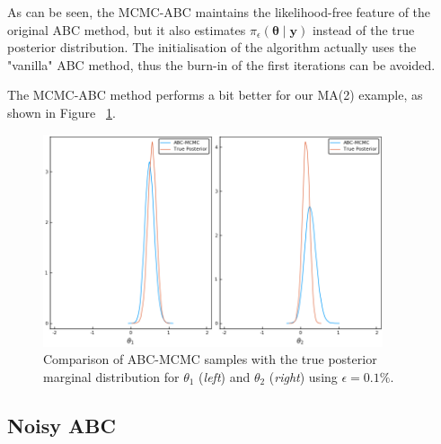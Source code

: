 \documentclass[runningheads]{llncs}
\begin{document}
As can be seen, the MCMC-ABC maintains the likelihood-free
feature of the original ABC method, but it also estimates
$\pi_\epsilon(\bm \theta \mid \bm y)$ instead of the true
posterior distribution. The initialisation of the algorithm
actually uses the "vanilla" ABC method, thus the burn-in
of the first iterations can be avoided.

The MCMC-ABC method performs a bit better
for our MA(2) example, as shown
in Figure ~\ref{fig:mcmcabc}.

\hfill\break
    \begin{figure}[H]
        \centering
        \includegraphics[width=10cm]{images/ABC-MCMC.png}
        \caption{Comparison of ABC-MCMC samples with the true posterior
        marginal distribution for $\theta_1$ (\textit{left}) and
        $\theta_2$ (\textit{right}) using $\epsilon = 0.1\%$.
        }
        \label{fig:mcmcabc}
    \end{figure}

\subsection{Noisy ABC}
\label{subsec:statistical-summaries}

%
%
%


%
\end{document}
